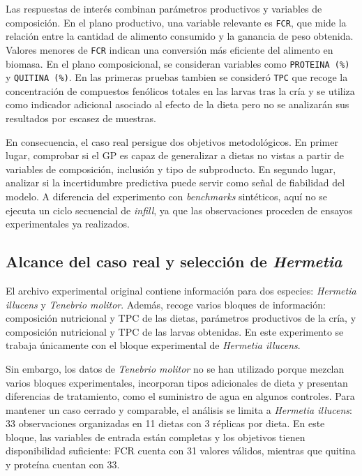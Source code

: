 Las respuestas de interés combinan parámetros productivos y variables de composición. En el plano productivo, una variable relevante es \texttt{FCR}, que mide la relación entre la cantidad de alimento consumido y la ganancia de peso obtenida. Valores menores de \texttt{FCR} indican una conversión más eficiente del alimento en biomasa. En el plano composicional, se consideran variables como \texttt{PROTEINA\ (\%)} y \texttt{QUITINA\ (\%)}. En las primeras pruebas tambien se consideró \texttt{TPC} que recoge la concentración de compuestos fenólicos totales en las larvas tras la cría y se utiliza como indicador adicional asociado al efecto de la dieta pero no se analizarán sus resultados por escasez de muestras.

En consecuencia, el caso real persigue dos objetivos metodológicos. En primer lugar, comprobar si el GP es capaz de generalizar a dietas no vistas a partir de variables de composición, inclusión y tipo de subproducto. En segundo lugar, analizar si la incertidumbre predictiva puede servir como señal de fiabilidad del modelo. A diferencia del experimento con \emph{benchmarks} sintéticos, aquí no se ejecuta un ciclo secuencial de \emph{infill}, ya que las observaciones proceden de ensayos experimentales ya realizados.

\subsection{\texorpdfstring{Alcance del caso real y selección de \emph{Hermetia}}{Alcance del caso real y selección de Hermetia}}\label{subsec:alcance_hermetia_caso_real}

El archivo experimental original contiene información para dos especies: \emph{Hermetia illucens} y \emph{Tenebrio molitor}. Además, recoge varios bloques de información: composición nutricional y TPC de las dietas, parámetros productivos de la cría, y composición nutricional y TPC de las larvas obtenidas. En este experimento se trabaja únicamente con el bloque experimental de \emph{Hermetia illucens}.

Sin embargo, los datos de \emph{Tenebrio molitor} no se han utilizado porque mezclan varios bloques experimentales, incorporan tipos adicionales de dieta y presentan diferencias de tratamiento, como el suministro de agua en algunos controles. Para mantener un caso cerrado y comparable, el análisis se limita a \emph{Hermetia illucens}: 33 observaciones organizadas en 11 dietas con 3 réplicas por dieta. En este bloque, las variables de entrada están completas y los objetivos tienen disponibilidad suficiente: FCR cuenta con 31 valores válidos, mientras que quitina y proteína cuentan con 33.

